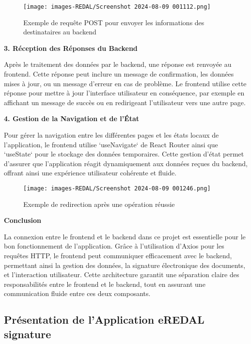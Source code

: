 \begin{figure}[H]
\begin{center}
\texttt{[image: images-REDAL/Screenshot 2024-08-09 001112.png]}
\end{center}
\caption{Exemple de requête POST pour envoyer les informations des destinataires au backend}
\end{figure}

\textbf{3. Réception des Réponses du Backend}

Après le traitement des données par le backend, une réponse est renvoyée au frontend. Cette réponse peut inclure un message de confirmation, les données mises à jour, ou un message d'erreur en cas de problème. Le frontend utilise cette réponse pour mettre à jour l'interface utilisateur en conséquence, par exemple en affichant un message de succès ou en redirigeant l'utilisateur vers une autre page.

\textbf{4. Gestion de la Navigation et de l'État}

Pour gérer la navigation entre les différentes pages et les états locaux de l'application, le frontend utilise `useNavigate` de React Router ainsi que `useState` pour le stockage des données temporaires. Cette gestion d'état permet d'assurer que l'application réagit dynamiquement aux données reçues du backend, offrant ainsi une expérience utilisateur cohérente et fluide.

\begin{figure}[H]
\begin{center}
\texttt{[image: images-REDAL/Screenshot 2024-08-09 001246.png]}
\end{center}
\caption{Exemple de redirection après une opération réussie}
\end{figure}

\textbf{ Conclusion}

La connexion entre le frontend et le backend dans ce projet est essentielle pour le bon fonctionnement de l'application. Grâce à l'utilisation d'Axios pour les requêtes HTTP, le frontend peut communiquer efficacement avec le backend, permettant ainsi la gestion des données, la signature électronique des documents, et l'interaction utilisateur. Cette architecture garantit une séparation claire des responsabilités entre le frontend et le backend, tout en assurant une communication fluide entre ces deux composants.





\newpage
\subsection{Présentation de l'Application \textbf{eREDAL signature}}


